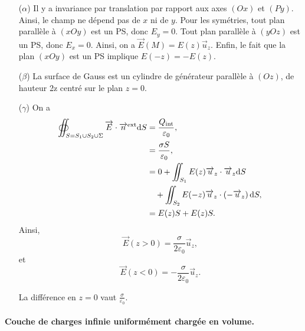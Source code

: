            \begin{itemize}
                \item [($\alpha$)] Il y a invariance par translation par rapport aux axes $(Ox)$ et $(Py)$. Ainsi, le champ ne dépend pas de $x$ ni de $y$. Pour les symétries, tout plan parallèle à $(xOy)$ est un PS, donc $E_y=0$. Tout plan parallèle à $(yOz)$ est un PS, donc $E_x=0$. Ainsi, on a $\vec{E}(M)=E(z)\vec{u}_z$.
                Enfin, le fait que la plan $(xOy)$ est un PS implique $E(-z)=-E(z)$.

                \item [($\beta$)] La surface de Gauss est un cylindre de générateur parallèle à $(Oz)$, de hauteur 2z centré sur le plan $z=0$.
                
                \item [($\gamma$)] On a 
                \begin{align}
                    \oiint_{S=S_1\cup S_2\cup \Sigma}\protect\overrightarrow{{E}}\cdot\protect\overrightarrow{{n}}^{\text{ext}}\mathrm{d} S
                    &=\frac{Q_{\text{int}}}{\varepsilon_0},\\
                    &=\frac{\sigma S}{\varepsilon_0},\\
                    &=0+\iint_{S_1}E(z)\protect\overrightarrow{{u}}_z\cdot\protect\overrightarrow{{u}}_z\mathrm{d} S\\
                    &\quad+\iint_{S_2}E(-z)\protect\overrightarrow{{u}}_z\cdot\left(-\protect\overrightarrow{{u}}_z\right)\mathrm{d} S,\\
                    &=
                    E(z)S+E(z)S.
                \end{align}
                Ainsi, 
                \begin{equation}
                    \boxed{\vec{E}(z>0)=\frac{\sigma}{2\varepsilon_0}\vec{u}_z,}
                \end{equation}
                et 
                \begin{equation}
                    \boxed{\vec{E}(z<0)=-\frac{\sigma}{2\varepsilon_0}\vec{u}_z.}
                \end{equation}
                
                La différence en $z=0$ vaut $\frac{\sigma}{\varepsilon_0}$.
            \end{itemize}

            \paragraph{Couche de charges infinie uniformément chargée en volume.}

